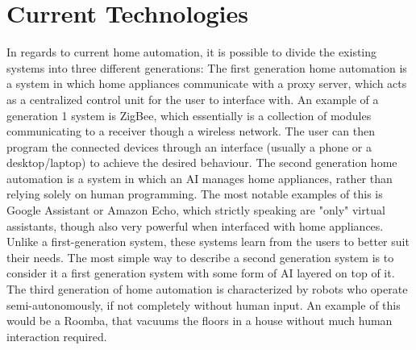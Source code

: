 \section{Current Technologies}
In regards to current home automation, it is possible to divide the existing systems into three different generations\cite{chinese-home-automation}:
\newline
The first generation home automation is a system in which home appliances communicate with a proxy server, which acts as a centralized control unit for the user to interface with. An example of a generation 1 system is ZigBee\cite{zigbee}, which essentially is a collection of modules communicating to a receiver though a wireless network. The user can then program the connected devices through an interface (usually a phone or a desktop/laptop) to achieve the desired behaviour.
\newline
The second generation home automation is a system in which an AI manages home appliances, rather than relying solely on human programming. The most notable examples of this is Google Assistant or Amazon Echo, which strictly speaking are "only" virtual assistants, though also very powerful when interfaced with home appliances. Unlike a first-generation system, these systems learn from the users to better suit their needs. The most simple way to describe a second generation system is to consider it a first generation system with some form of AI layered on top of it.
\newline
The third generation of home automation is characterized by robots who operate semi-autonomously, if not completely without human input. An example of this would be a Roomba, that vacuums the floors in a house without much human interaction required.
\newline